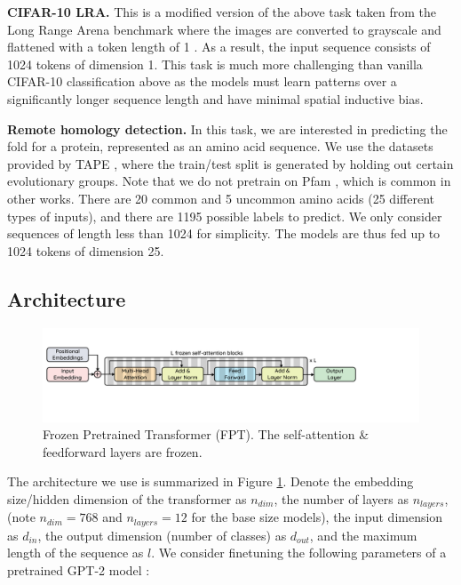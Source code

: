 \textbf{CIFAR-10 LRA.}
This is a modified version of the above task taken from the Long Range Arena benchmark where the images are converted to grayscale and flattened with a token length of 1 \citep{tay2020lra}.
As a result, the input sequence consists of 1024 tokens of dimension 1.
This task is much more challenging than vanilla CIFAR-10 classification above as the models must learn patterns over a significantly longer sequence length and have minimal spatial inductive bias.

\textbf{Remote homology detection.}
In this task, we are interested in predicting the fold for a protein, represented as an amino acid sequence.
We use the datasets provided by TAPE \citep{rap2019tape, fox2013scop, hou2018deepsf}, where the train/test split is generated by holding out certain evolutionary groups.
Note that we do not pretrain on Pfam \citep{elgebali2019pfam}, which is common in other works.
There are 20 common and 5 uncommon amino acids (25 different types of inputs), and there are 1195 possible labels to predict.
We only consider sequences of length less than 1024 for simplicity.
The models are thus fed up to 1024 tokens of dimension 25.

\subsection{Architecture}
\label{sec:architecture}

\begin{figure}
    \centering
    \includegraphics[width=1\linewidth]{figures/architecture/architecture.pdf}
    
    \caption{
        Frozen Pretrained Transformer (FPT).
        The self-attention \& feedforward layers are frozen.
    }
    \label{fig:architecture}
\end{figure}

The architecture we use is summarized in Figure \ref{fig:architecture}.
Denote the embedding size/hidden dimension of the transformer as $n_{dim}$, the number of layers as $n_{layers}$, (note $n_{dim} = 768$ and $n_{layers} = 12$ for the base size models), the input dimension as $d_{in}$, the output dimension (number of classes) as $d_{out}$, and the maximum length of the sequence as $l$.
We consider finetuning the following parameters of a pretrained GPT-2 model \citep{radford2019gpt2}:

